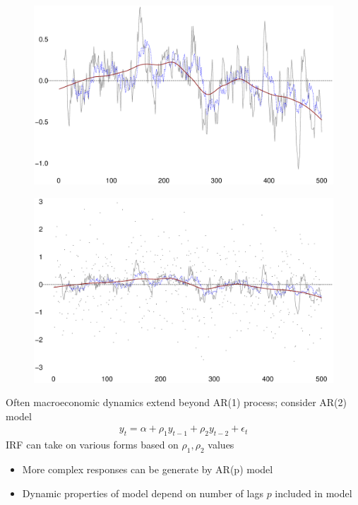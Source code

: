 \documentclass{beamer}
\begin{document}
\begin{frame}
  \begin{figure}
    \includegraphics[scale=.3]{slutsky.eps}
  \end{figure}
\end{frame}

\begin{frame}
  \begin{figure}
    \includegraphics[scale=.3]{slutsky2.eps}
  \end{figure}
\end{frame}


\begin{frame}
  Often macroeconomic dynamics extend beyond AR(1) process; consider AR(2) model
  \begin{align}
  y_t = \alpha + \rho_1 y_{t-1} + \rho_2 y_{t-2} + \epsilon_t
  \end{align}
  \medskip
  IRF can take on various forms based on $\rho_1,\rho_2$ values
  \begin{itemize}
    \item More complex responses can be generate by AR(p) model
    \item Dynamic properties of model depend on number of lags $p$ included in model
  \end{itemize}
\end{frame}
\end{document}
